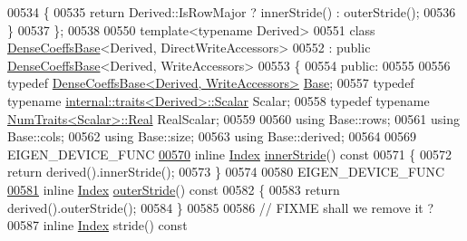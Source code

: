 \begin{DoxyCode}
00534 \textcolor{keyword}{    }\{
00535       \textcolor{keywordflow}{return} Derived::IsRowMajor ? innerStride() : outerStride();
00536     \}
00537 \};
00538 
00550 \textcolor{keyword}{template}<\textcolor{keyword}{typename} Derived>
00551 \textcolor{keyword}{class }\hyperlink{class_eigen_1_1_dense_coeffs_base}{DenseCoeffsBase}<Derived, DirectWriteAccessors>
00552   : \textcolor{keyword}{public} \hyperlink{class_eigen_1_1_dense_coeffs_base}{DenseCoeffsBase}<Derived, WriteAccessors>
00553 \{
00554   \textcolor{keyword}{public}:
00555 
00556     \textcolor{keyword}{typedef} \hyperlink{group___core___module_class_eigen_1_1_dense_coeffs_base_3_01_derived_00_01_write_accessors_01_4}{DenseCoeffsBase<Derived, WriteAccessors>} 
      \hyperlink{group___core___module_class_eigen_1_1_dense_coeffs_base_3_01_derived_00_01_read_only_accessors_01_4}{Base};
00557     \textcolor{keyword}{typedef} \textcolor{keyword}{typename} \hyperlink{struct_eigen_1_1internal_1_1traits}{internal::traits<Derived>::Scalar} Scalar;
00558     \textcolor{keyword}{typedef} \textcolor{keyword}{typename} \hyperlink{group___core___module_struct_eigen_1_1_num_traits}{NumTraits<Scalar>::Real} RealScalar;
00559 
00560     \textcolor{keyword}{using} Base::rows;
00561     \textcolor{keyword}{using} Base::cols;
00562     \textcolor{keyword}{using} Base::size;
00563     \textcolor{keyword}{using} Base::derived;
00564 
00569     EIGEN\_DEVICE\_FUNC
\hyperlink{group___core___module_a28016205b69c3df8152680fea9390937}{00570}     \textcolor{keyword}{inline} \hyperlink{group___core___module_a554f30542cc2316add4b1ea0a492ff02}{Index} \hyperlink{group___core___module_a28016205b69c3df8152680fea9390937}{innerStride}()\textcolor{keyword}{ const}
00571 \textcolor{keyword}{    }\{
00572       \textcolor{keywordflow}{return} derived().innerStride();
00573     \}
00574 
00580     EIGEN\_DEVICE\_FUNC
\hyperlink{group___core___module_a024394b03623c6ce5a2aab5eb94d78a8}{00581}     \textcolor{keyword}{inline} \hyperlink{group___core___module_a554f30542cc2316add4b1ea0a492ff02}{Index} \hyperlink{group___core___module_a024394b03623c6ce5a2aab5eb94d78a8}{outerStride}()\textcolor{keyword}{ const}
00582 \textcolor{keyword}{    }\{
00583       \textcolor{keywordflow}{return} derived().outerStride();
00584     \}
00585 
00586     \textcolor{comment}{// FIXME shall we remove it ?}
00587     \textcolor{keyword}{inline} \hyperlink{group___core___module_a554f30542cc2316add4b1ea0a492ff02}{Index} stride()\textcolor{keyword}{ const}

\end{DoxyCode}
